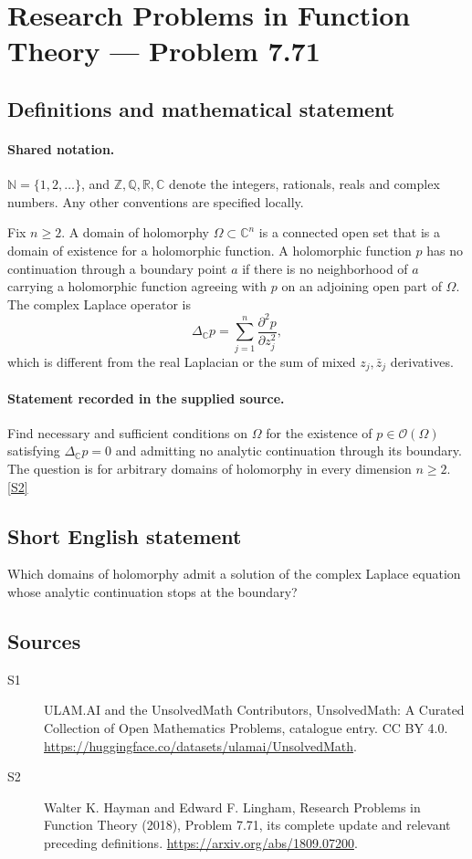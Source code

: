 \documentclass[11pt]{article}
\newcommand{\sref}[2]{\hyperlink{source:#1:#2}{[S#2]}}
\begin{document}
\section{Research Problems in Function Theory — Problem 7.71}\label{statement}

\subsection{Definitions and mathematical statement}

\paragraph{Shared notation.}$\mathbb N=\{1,2,\ldots\}$, and $\mathbb Z,\mathbb Q,\mathbb R,\mathbb C$ denote the integers, rationals, reals and complex numbers. Any other conventions are specified locally.


Fix $n\ge2$. A domain of holomorphy $\Omega\subset\mathbb C^n$ is a connected open set that is a domain of existence for a holomorphic function. A holomorphic function $p$ has no continuation through a boundary point $a$ if there is no neighborhood of $a$ carrying a holomorphic function agreeing with $p$ on an adjoining open part of $\Omega$. The complex Laplace operator is
\[\Delta_{\mathbb C}p=\sum_{j=1}^n\frac{\partial^2p}{\partial z_j^2},
\]
which is different from the real Laplacian or the sum of mixed $z_j,\bar z_j$ derivatives.
\paragraph{Statement recorded in the supplied source.}
Find necessary and sufficient conditions on $\Omega$ for the existence of $p\in\mathcal O(\Omega)$ satisfying $\Delta_{\mathbb C}p=0$ and admitting no analytic continuation through its boundary. The question is for arbitrary domains of holomorphy in every dimension $n\ge2$. \sref{statement}{2}
\subsection{Short English statement}
Which domains of holomorphy admit a solution of the complex Laplace equation whose analytic continuation stops at the boundary?
\subsection{Sources}
\begin{description}
\item[\hypertarget{source:statement:1}{S1}] ULAM.AI and the UnsolvedMath Contributors, UnsolvedMath: A Curated Collection of Open Mathematics Problems, catalogue entry. CC BY 4.0. \url{https://huggingface.co/datasets/ulamai/UnsolvedMath}.
\item[\hypertarget{source:statement:2}{S2}] Walter K. Hayman and Edward F. Lingham, Research Problems in Function Theory (2018), Problem 7.71, its complete update and relevant preceding definitions. \url{https://arxiv.org/abs/1809.07200}.
\end{description}
\label{end:statement}
\end{document}

